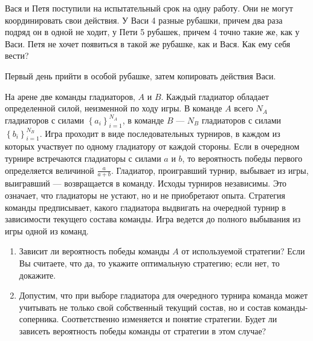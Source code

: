 \begin{problem}
Вася и Петя поступили на испытательный срок на одну работу. Они не могут координировать свои действия. У Васи 4 разные рубашки, причем два раза подряд он в одной не ходит, у Пети 5 рубашек, причем 4 точно такие же, как у Васи. Петя не хочет появиться в такой же рубашке, как и Вася. Как ему себя вести? \par
\begin{sol}
Первый день прийти в особой рубашке, затем копировать действия Васи.
\end{sol}
\end{problem}



\begin{problem}\par
\begin{source} \cite{winkler:gpdp} \end{source}
На арене две команды гладиаторов,  $A$  и  $B$. Каждый гладиатор обладает определенной силой, неизменной по ходу игры. В команде  $A$  всего  $N_{A} $  гладиаторов с силами  $\left\{a_{i} \right\}_{i=1}^{N_{A} } $, в команде  $B$  ---  $N_{B} $  гладиаторов с силами  $\left\{b_{i} \right\}_{i=1}^{N_{B} } $. Игра проходит в виде последовательных турниров, в каждом из которых участвует по одному гладиатору от каждой стороны. Если в очередном турнире встречаются гладиаторы с силами  $a$  и  $b$, то вероятность победы первого определяется величиной  $\frac{a}{a+b} $. Гладиатор, проигравший турнир, выбывает из игры, выигравший --- возвращается в команду. Исходы турниров независимы. Это означает, что гладиаторы не устают, но и не приобретают опыта. Стратегия команды предписывает, какого гладиатора выдвигать на очередной турнир в зависимости текущего состава команды. Игра ведется до полного выбывания из игры одной из команд.\par

\begin{enumerate}
\item Зависит ли вероятность победы команды  $A$  от используемой стратегии? Если Вы считаете, что да, то укажите оптимальную стратегию; если нет, то докажите.\par
\item Допустим, что при выборе гладиатора для очередного турнира команда может учитывать не только свой собственный текущий состав, но и состав команды-соперника. Соответственно изменяется и понятие стратегии. Будет ли зависеть вероятность победы команды от стратегии в этом случае?\par
\end{enumerate}
\begin{sol}

\end{sol}
\end{problem}




